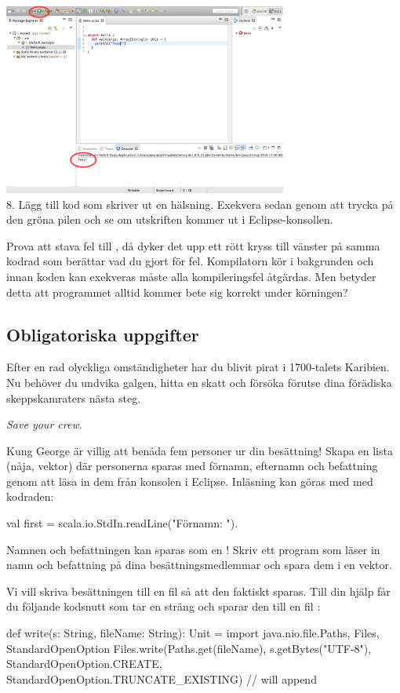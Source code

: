 \begin{center}
\vspace{5mm}
\includegraphics[width=0.7\textwidth]{../img/pirates/exekvera.png} \\
8. Lägg till kod som skriver ut en hälsning. Exekvera sedan genom att trycka på den gröna pilen och se om utskriften kommer ut i  Eclipse-konsollen.
\end{center}

Prova att stava fel till , då dyker det upp ett rött kryss till vänster på samma kodrad som berättar vad du gjort för fel. Kompilatorn kör i bakgrunden och innan koden kan exekveras måste alla kompileringsfel åtgärdas. Men betyder detta att programmet alltid kommer bete sig korrekt under körningen?


\subsection{Obligatoriska uppgifter}
Efter en rad olyckliga omständigheter har du blivit pirat i 1700-talets Karibien. Nu beh{\"o}ver du undvika galgen, hitta en skatt och f{\"o}rs{\"o}ka f{\"o}rutse dina f{\"o}r{\"a}diska skeppskamraters n{\"a}sta steg.

\Task \emph{Save your crew}. 

\Subtask Kung George {\"a}r villig att ben{\aa}da fem personer ur din bes{\"a}ttning! Skapa en lista (nåja, vektor) d{\"a}r personerna sparas med f{\"o}rnamn, efternamn och befattning genom att l{\"a}sa in dem fr{\aa}n konsolen i Eclipse. Inl{\"a}sning kan g{\"o}ras med  med kodraden: 
\begin{Code}
val first = scala.io.StdIn.readLine("Förnamn: "). 
\end{Code}
Namnen och befattningen kan sparas som en ! Skriv ett program som läser in namn och befattning på dina besättningsmedlemmar och spara dem i en vektor.

\Subtask Vi vill skriva besättningen till en fil så att den faktiskt sparas. Till din hjälp får du följande kodsnutt som tar en sträng  och sparar den till en fil :
\begin{Code}
def write(s: String, fileName: String): Unit = {
	import java.nio.file.{Paths, Files, StandardOpenOption}
	Files.write(Paths.get(fileName), s.getBytes("UTF-8"), 
	StandardOpenOption.CREATE, 
	StandardOpenOption.TRUNCATE_EXISTING) // will append
}
\end{Code}

